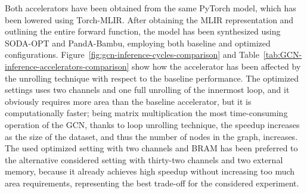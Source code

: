 Both accelerators have been obtained from the same PyTorch model, which has been lowered using Torch-MLIR\@.
After obtaining the MLIR representation and outlining the entire forward function, the model has been synthesized using SODA-OPT and PandA-Bambu, employing both baseline and optimized configurations.
Figure~\ref{fig:gcn-inference-cycles-comparison} and Table~\ref{tab:GCN-inference-accelerators-comparison} show how the accelerator has been affected by the unrolling technique with respect to the baseline performance.
The optimized settings uses two channels and one full unrolling of the innermost loop, and it obviously requires more area than the baseline accelerator, but it is computationally faster; being matrix multiplication the most time-consuming operation of the GCN, thanks to loop unrolling technique, the speedup increases as the size of the dataset, and thus the number of nodes in the graph, increases.
The used optimized setting with two channels and BRAM has been preferred to the alternative considered setting with thirty-two channels and two external memory, because it already achieves high speedup without increasing too much area requirements, representing the best trade-off for the considered experiment.

